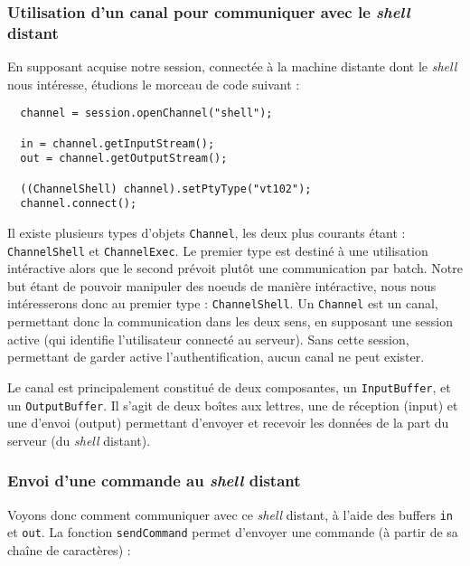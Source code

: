 \subsubsection{Utilisation d'un canal pour communiquer avec le \emph{shell} distant}
\label{sec:util-dun-canal}

\par En supposant acquise notre session, connectée à la machine distante dont le \emph{shell} nous intéresse, étudions le morceau de code suivant :

\begin{verbatim}
  channel = session.openChannel("shell");
  
  in = channel.getInputStream();
  out = channel.getOutputStream();
  
  ((ChannelShell) channel).setPtyType("vt102");
  channel.connect();
\end{verbatim}

\par Il existe plusieurs types d'objets \texttt{Channel}, les deux plus courants étant : \texttt{ChannelShell} et \texttt{ChannelExec}. Le premier type est destiné à une utilisation intéractive alors que le second prévoit plutôt une communication par batch. Notre but étant de pouvoir manipuler des noeuds de manière intéractive, nous nous intéresserons donc au premier type : \texttt{ChannelShell}. Un \texttt{Channel} est un canal, permettant donc la communication dans les deux sens, en supposant une session active (qui identifie l'utilisateur connecté au serveur). Sans cette session, permettant de garder active l'authentification, aucun canal ne peut exister.
\par Le canal est principalement constitué de deux composantes, un \texttt{InputBuffer}, et un \texttt{OutputBuffer}. Il s'agit de deux boîtes aux lettres, une de réception (input) et une d'envoi (output) permettant d'envoyer et recevoir les données de la part du serveur (du \emph{shell} distant). 

\subsubsection{Envoi d'une commande au \emph{shell} distant}
\label{sec:envoi-dune-commande}

\par Voyons donc comment communiquer avec ce \emph{shell} distant, à l'aide des buffers \texttt{in} et \texttt{out}. La fonction \texttt{sendCommand} permet d'envoyer une commande (à partir de sa chaîne de caractères) :

